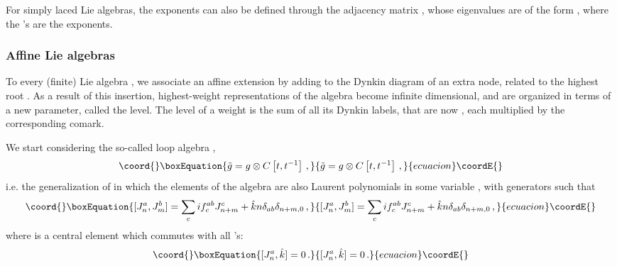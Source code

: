 \documentclass[a4paper,12pt]{report}
\begin{document}
For simply laced Lie algebras, the exponents can also be defined through the adjacency matrix
\coordHE{}, whose eigenvalues are of the form \coordHE{}, where the \coordHE{}'s are the
exponents.

\vspace{0.5cm}

\subsubsection{Affine Lie algebras}

To every (finite) Lie algebra \coordHE{}, we associate an affine extension \coordHE{} by adding to the Dynkin diagram of
\coordHE{} an extra node, related to the highest root \myHighlight{$\theta$}\coordHE{}. As a result of this insertion, highest-weight
representations of the algebra become infinite dimensional, and are organized in terms of a new parameter, called
the level. The level of a weight is the sum of all its Dynkin labels, that are now \coordHE{}, each multiplied by the
corresponding comark.

We start considering the so-called loop algebra \coordHE{},
\begin{equation}\coord{}\boxEquation{
\tilde{g}=g\otimes C\left[t,t^{-1}\right]\,,
}{
\tilde{g}=g\otimes C\left[t,t^{-1}\right]\,,
}{ecuacion}\coordE{}\end{equation}
i.e. the generalization of \coordHE{} in which the elements of the algebra are also Laurent polynomials in some variable
\coordHE{}, with generators \coordHE{} such that
\begin{equation}\coord{}\boxEquation{\label{currentalg}
[J_{n}^{a},J_{m}^{b}]=\sum_{c}if^{ab}_{c}J_{n+m}^{c}+\hat{k}n\delta_{ab}\delta_{n+m,0}\,,
}{[J_{n}^{a},J_{m}^{b}]=\sum_{c}if^{ab}_{c}J_{n+m}^{c}+\hat{k}n\delta_{ab}\delta_{n+m,0}\,,
}{ecuacion}\coordE{}\end{equation}
where \coordHE{} is a central element which commutes with all \coordHE{}'s:
\begin{equation}\coord{}\boxEquation{
[J_{n}^{a},\hat{k}]=0\,.
}{
[J_{n}^{a},\hat{k}]=0\,.
}{ecuacion}\coordE{}\end{equation}
\end{document}
